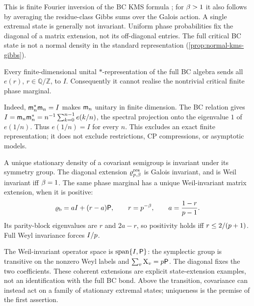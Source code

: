 This is finite Fourier inversion of the BC KMS formula
\cite{connesmarcolli2004physics}; for $\beta>1$ it also follows by averaging
the residue-class Gibbs sums over the Galois action. A single extremal state
is generally not invariant. Uniform phase probabilities fix the diagonal
of a matrix extension, not its off-diagonal entries. The full critical BC
state is not a normal density in the standard representation
(\cref{prop:normal-kms-gibbs}).

\begin{proposition}
\label{prop:bc-no-finite-phase-representation}
Every finite-dimensional unital $*$-representation of the full BC algebra
sends all $e(r)$, $r\in\mathbb Q/\mathbb Z$, to $I$.
Consequently it cannot realise the nontrivial critical finite phase marginal.
\end{proposition}

Indeed, $\mathsf m_{n}^*\mathsf m_{n}=I$ makes $\mathsf m_{n}$ unitary in finite dimension.
The BC relation gives
$I=\mathsf m_{n}\mathsf m_{n}^*=n^{-1}\sum_{k=0}^{n-1}e(k/n)$,
the spectral projection onto the eigenvalue $1$ of $e(1/n)$.
Thus $e(1/n)=I$ for every $n$. This excludes an exact finite representation;
it does not exclude restrictions, CP compressions, or asymptotic models.

\begin{proposition}
\label{prop:bc-symmetry-state-extension}
A unique stationary density of a covariant semigroup is invariant under
its symmetry group. The diagonal extension $\varrho^{\mathrm{res}}_{p,\beta}$ is
Galois invariant, and is Weil invariant iff $\beta=1$.
The same phase marginal has a unique Weil-invariant matrix extension,
when it is positive:
\[
 \varrho_{\mathrm b}=aI+(r-a)\mathsf P,\qquad
 r=p^{-\beta},\qquad a=\frac{1-r}{p-1}.
\]
Its parity-block eigenvalues are $r$ and $2a-r$, so positivity holds iff
$r\le2/(p+1)$. Full Weyl invariance forces $I/p$.
\end{proposition}

The Weil-invariant operator space is $\operatorname{span}\{I,\mathsf P\}$:
the symplectic group is transitive on the nonzero Weyl labels and
$\sum_v\mathrm{X}_{v}=p\mathsf P$. The diagonal fixes the two coefficients.
These coherent extensions are explicit state-extension examples, not an
identification with the full BC bond. Above the transition, covariance can
instead act on a family of stationary extremal states; uniqueness is the
premise of the first assertion.

